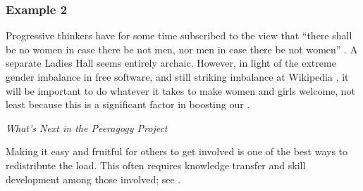 \subsubsection*{Example 2}
Progressive thinkers have for
some time subscribed to the view that ``there shall be no women in
case there be not men, nor men in case there be not women''
\cite[Chapter 1.LII]{rabelais1894gargantua}.
A separate Ladies Hall seems entirely archaic.
However, in light of the
extreme gender imbalance in free software, and still striking
imbalance at Wikipedia \cite{gender,FM4291}, it will be important to
do whatever it takes to make women and girls welcome, not least
because this is a significant factor in boosting our
.


\begin{framed}
\noindent 
\emph{What's Next in the Peeragogy Project}
\begin{collectinmacro}{\CarryingWN}{}{}
Making it easy and fruitful for others to get involved is one of the best ways to redistribute the load.  This often requires knowledge transfer and skill development among those involved; see .
\end{collectinmacro}
\CarryingWN
\end{framed}


